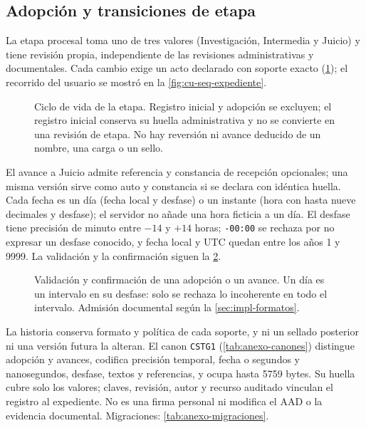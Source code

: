 \subsection{Adopción y transiciones de etapa}\label{sec:impl-http-etapas}

La etapa procesal toma uno de tres valores (Investigación, Intermedia y Juicio) y tiene revisión propia, independiente de las revisiones administrativas y documentales. Cada cambio exige un acto declarado con soporte exacto (\cref{fig:impl-etapas-estados}); el recorrido del usuario se mostró en la \cref{fig:cu-seq-expediente}.

\begin{figure}[t]
  \centering
  
  \caption{Ciclo de vida de la etapa. Registro inicial y adopción se excluyen; el registro inicial conserva su huella administrativa y no se convierte en una revisión de etapa. No hay reversión ni avance deducido de un nombre, una carga o un sello.}
  \label{fig:impl-etapas-estados}
\end{figure}

El avance a Juicio admite referencia y constancia de recepción opcionales; una misma versión sirve como auto y constancia si se declara con idéntica huella. Cada fecha es un día (fecha local y desfase) o un instante (hora con hasta nueve decimales y desfase); el servidor no añade una hora ficticia a un día. El desfase tiene precisión de minuto entre $-14$ y $+14$ horas; \texttt{-00:00} se rechaza por no expresar un desfase conocido, y fecha local y UTC quedan entre los años 1 y 9999. La validación y la confirmación siguen la \cref{fig:impl-etapas-confirmacion}.

\begin{figure}[t]
  \centering
  
  \caption{Validación y confirmación de una adopción o un avance. Un día es un intervalo en su desfase: solo se rechaza lo incoherente en todo el intervalo. Admisión documental según la \cref{sec:impl-formatos}.}
  \label{fig:impl-etapas-confirmacion}
\end{figure}

La historia conserva formato y política de cada soporte, y ni un sellado posterior ni una versión futura la alteran. El canon \texttt{CSTG1} (\cref{tab:anexo-canones}) distingue adopción y avances, codifica precisión temporal, fecha o segundos y nanosegundos, desfase, textos y referencias, y ocupa hasta 5759 bytes. Su huella cubre solo los valores; claves, revisión, autor y recurso auditado vinculan el registro al expediente. No es una firma personal ni modifica el AAD o la evidencia documental. Migraciones: \cref{tab:anexo-migraciones}.

